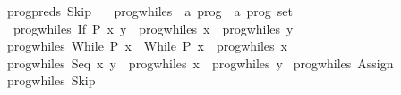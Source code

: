 \begin{isabellebody}
{}\ {}prog{}preds\ Skip\ {}\ {}{}{}\isanewline
\isanewline
{}\isamarkupfalse%
\ prog{}whiles\ {}{}\ {}{}a\ prog\ {}\ {}a\ prog\ set{}\ \isanewline
\ \ {}prog{}whiles\ {}If\ P\ x\ y{}\ {}\ prog{}whiles\ x\ {}\ prog{}whiles\ y{}\isanewline
{}\ {}prog{}whiles\ {}While\ P\ x{}\ {}\ {}While\ P\ x{}\ {}\ prog{}whiles\ x{}\isanewline
{}\ {}prog{}whiles\ {}Seq\ x\ y{}\ {}\ prog{}whiles\ x\ {}\ prog{}whiles\ y{}\isanewline
{}\ {}prog{}whiles\ {}Assign\ {}\ {}{}\ {}\ {}{}{}\isanewline
{}\ {}prog{}whiles\ Skip\ {}\ {}{}{}\isanewline

\end{isabellebody}
